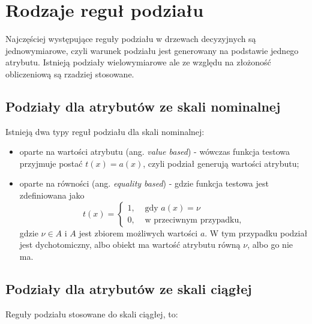 \documentclass[
]{book}
\providecommand{\tightlist}{%
  \setlength{\itemsep}{0pt}\setlength{\parskip}{0pt}}
\theoremstyle{plain}
\theoremstyle{definition}
\theoremstyle{definition}
\theoremstyle{definition}
\theoremstyle{definition}
\theoremstyle{definition}
\theoremstyle{remark}
\begin{document}
\section{Rodzaje reguł podziału}\label{rodzaje-reguux142-podziaux142u}

Najczęściej występujące reguły podziału w drzewach decyzyjnych są jednowymiarowe, czyli warunek podziału jest generowany na podstawie jednego atrybutu. Istnieją podziały wielowymiarowe ale ze względu na złożoność obliczeniową są rzadziej stosowane.

\subsection{Podziały dla atrybutów ze skali nominalnej}\label{podziaux142y-dla-atrybutuxf3w-ze-skali-nominalnej}

Istnieją dwa typy reguł podziału dla skali nominalnej:

\begin{itemize}
\tightlist
\item
  oparte na wartości atrybutu (ang. \emph{value based}) - wówczas funkcja testowa przyjmuje postać \(t(x)=a(x)\), czyli podział generują wartości atrybutu;
\item
  oparte na równości (ang. \emph{equality based}) - gdzie funkcja testowa jest zdefiniowana jako
  \begin{equation}
    t(x)= \begin{cases}
        1, &\text{ gdy } a(x)=\nu\\
        0, & \text{ w przeciwnym przypadku},
    \end{cases}
  \end{equation}
  gdzie \(\nu\in A\) i \(A\) jest zbiorem możliwych wartości \(a\). W tym przypadku podział jest dychotomiczny, albo obiekt ma wartość atrybutu równą \(\nu\), albo go nie ma.
\end{itemize}

\subsection{Podziały dla atrybutów ze skali ciągłej}\label{podziaux142y-dla-atrybutuxf3w-ze-skali-ciux105gux142ej}

Reguły podziału stosowane do skali ciągłej, to:
\end{document}
